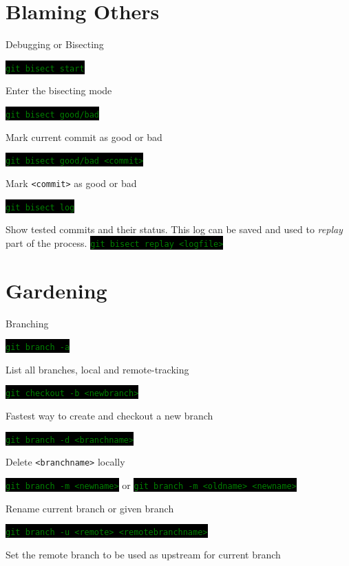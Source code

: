 \documentclass[
14pt,
aspectratio=169,
usenames,
dvipsnames,
x11names]{beamer}
\newcommand{\code}[1]{{\small\colorbox{black}{\textcolor{green}{\texttt{#1}}}}}
\begin{document}
\section{Blaming Others}

\begin{frame}{Debugging or Bisecting}

  \code{git bisect start}

  Enter the bisecting mode

  \vfill
  \pause

  \code{git bisect good/bad}

  Mark current commit as good or bad

  \vfill
  \pause

  \code{git bisect good/bad <commit>}

  Mark \texttt{<commit>} as good or bad

  \vfill
  \pause

  \code{git bisect log}

  Show tested commits and their status.
  This log can be saved and used to \textit{replay} part of the process.
  \code{git bisect replay <logfile>}

\end{frame}

\section{Gardening}

\begin{frame}{Branching}

  \code{git branch -a}

  List all branches, local and remote-tracking

  \vfill
  \pause

  \code{git checkout -b <newbranch>}

  Fastest way to create and checkout a new branch

  \vfill
  \pause

  \code{git branch -d <branchname>}

  Delete \texttt{<branchname>} locally

  \vfill
  \pause

  \code{git branch -m <newname>} or \code{git branch -m <oldname> <newname>}

  Rename current branch or given branch

  \vfill
  \pause

  \code{git branch -u <remote> <remotebranchname>}

  Set the remote branch to be used as upstream for current branch

\end{frame}
\end{document}
